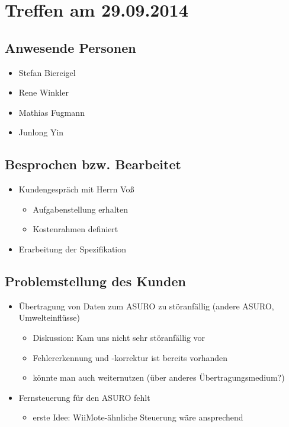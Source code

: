 \chapter{Treffen am 29.09.2014}
\section{Anwesende Personen}
\begin{itemize}
	\item Stefan Biereigel
	\item Rene Winkler
	\item Mathias Fugmann
	\item Junlong Yin
\end{itemize}

\section{Besprochen bzw. Bearbeitet}
\begin{itemize}
	\item Kundengespräch mit Herrn Voß
		\begin{itemize}
			\item Aufgabenstellung erhalten
			\item Kostenrahmen definiert
		\end{itemize}
	\item Erarbeitung der Spezifikation
\end{itemize}

\section{Problemstellung des Kunden}
\begin{itemize}
	\item Übertragung von Daten zum ASURO zu störanfällig (andere ASURO, Umwelteinflüsse)
	\begin{itemize}
		\item Diskussion: Kam uns nicht sehr störanfällig vor
		\item Fehlererkennung und -korrektur ist bereits vorhanden
		\item könnte man auch weiternutzen (über anderes Übertragungsmedium?)
	\end{itemize}
	\item Fernsteuerung für den ASURO fehlt
	\begin{itemize}
		\item erste Idee: WiiMote-ähnliche Steuerung wäre ansprechend
	\end{itemize}
\end{itemize}


